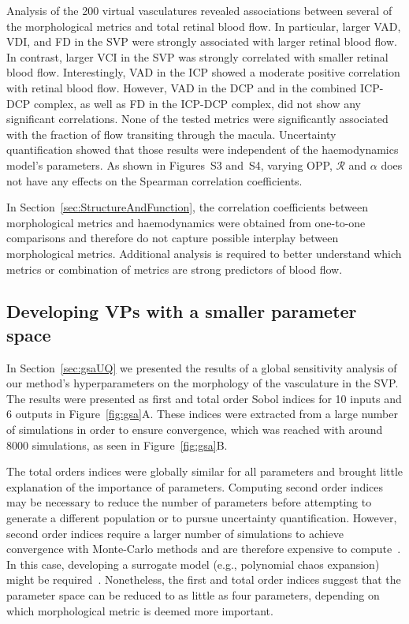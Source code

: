 \documentclass[11pt,]{article}
\begin{document}
Analysis of the \SI{200}{} virtual vasculatures revealed associations between several of the morphological metrics and total retinal blood flow.
In particular, larger VAD, VDI, and FD in the SVP were strongly associated with larger retinal blood flow.
In contrast, larger VCI in the SVP was strongly correlated with smaller retinal blood flow.
Interestingly, VAD in the ICP showed a moderate positive correlation with retinal blood flow.
However, VAD in the DCP and in the combined ICP-DCP complex, as well as FD in the ICP-DCP complex, did not show any significant correlations.
None of the tested metrics were significantly associated with the fraction of flow transiting through the macula.
Uncertainty quantification showed that those results were independent of the haemodynamics model's parameters.
As shown in Figures~S3 and~S4, varying OPP, $\mathcal R$ and $\alpha$ does not have any effects on the Spearman correlation coefficients.

In Section~\ref{sec:StructureAndFunction}, the correlation coefficients between morphological metrics and haemodynamics were obtained from one-to-one comparisons and therefore do not capture possible interplay between morphological metrics.
Additional analysis is required to better understand which metrics or combination of metrics are strong predictors of blood flow.

\subsection{Developing VPs with a smaller parameter space}\label{sec:disc-gsa}

In Section~\ref{sec:gsaUQ} we presented the results of a global sensitivity analysis of our method's hyperparameters on the morphology of the vasculature in the SVP.
The results were presented as first and total order Sobol indices for 10 inputs and 6 outputs in Figure~\ref{fig:gsa}A.
These indices were extracted from a large number of simulations in order to ensure convergence, which was reached with around \SI{8000}{} simulations, as seen in Figure~\ref{fig:gsa}B.

The total orders indices were globally similar for all parameters and brought little explanation of the importance of parameters.
Computing second order indices may be necessary to reduce the number of parameters before attempting to generate a different population or to pursue uncertainty quantification.
However, second order indices require a larger number of simulations to achieve convergence with Monte-Carlo methods and are therefore expensive to compute~\cite{Saltelli2008}.
In this case, developing a surrogate model (e.g., polynomial chaos expansion) might be required~\cite{Saltelli2008}.
Nonetheless, the first and total order indices suggest that the parameter space can be reduced to as little as four parameters, depending on which morphological metric is deemed more important.
\end{document}
